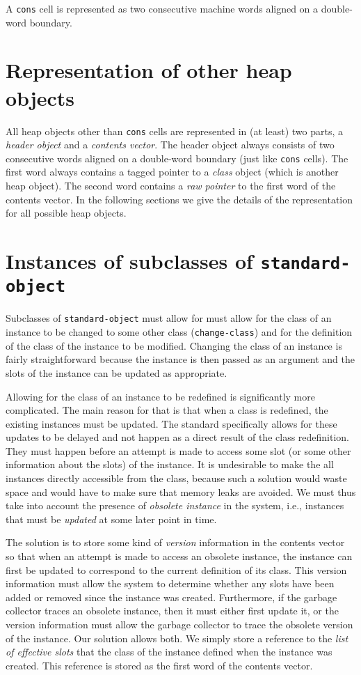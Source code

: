 A \texttt{cons} cell is represented as two consecutive machine
words aligned on a double-word boundary.

\section{Representation of other heap objects}

All heap objects other than \texttt{cons} cells are represented in (at
least) two parts, a \emph{header object} and a \emph{contents vector}.
The header object always consists of two consecutive words aligned on
a double-word boundary (just like \texttt{cons} cells).  The first
word always contains a tagged pointer to a \emph{class} object (which
is another heap object).  The second word contains a \emph{raw
  pointer} to the first word of the contents vector.  In the following
sections we give the details of the representation for all possible
heap objects.

\section{Instances of subclasses of \texttt{standard-object}}

Subclasses of \texttt{standard-object} must allow for must allow for
the class of an instance to be changed to some other class
(\texttt{change-class}) and for the definition of the class of the
instance to be modified.  Changing the class of an instance is fairly
straightforward because the instance is then passed as an argument and
the slots of the instance can be updated as appropriate.

Allowing for the class of an instance to be redefined is significantly
more complicated.  The main reason for that is that when a class is
redefined, the existing instances must be updated.  The standard
specifically allows for these updates to be delayed and not happen as
a direct result of the class redefinition.  They must happen before an
attempt is made to access some slot (or some other information about
the slots) of the instance.  It is undesirable to make the all
instances directly accessible from the class, because such a solution
would waste space and would have to make sure that memory leaks are
avoided.  We must thus take into account the presence of
\emph{obsolete instance} in the system, i.e., instances that must be
\emph{updated} at some later point in time. 

The solution is to store some kind of \emph{version} information in
the contents vector so that when an attempt is made to access an
obsolete instance, the instance can first be updated to correspond to
the current definition of its class.  This version information must
allow the system to determine whether any slots have been added or
removed since the instance was created.  Furthermore, if the garbage
collector traces an obsolete instance, then it must either first
update it, or the version information must allow the garbage collector
to trace the obsolete version of the instance.  Our solution allows
both.  We simply store a reference to the \emph{list of effective
  slots} that the class of the instance defined when the instance was
created.  This reference is stored as the first word of the contents
vector.  

